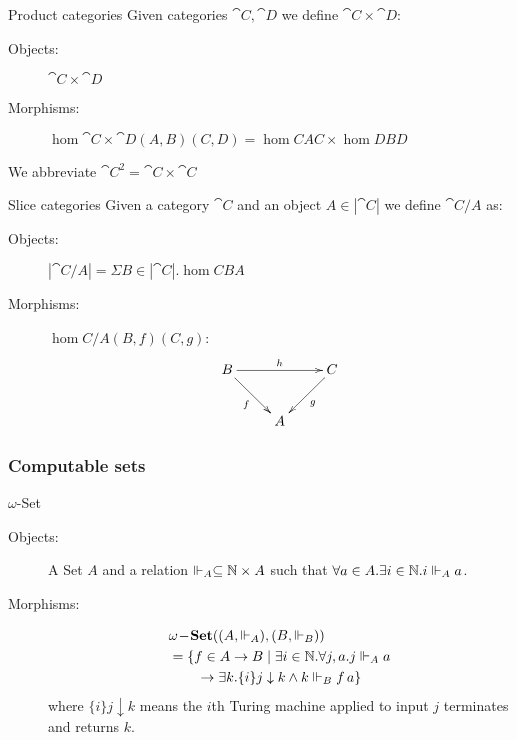 \documentclass[handout]{beamer}
\begin{document}
\begin{frame}
  \begin{block}{Product categories}
    Given categories $\cat{C},\cat{D}$ we define $\cat{C}\times\cat{D}$:
    \begin{description}
   \item[Objects:] $\cat{C}\times \cat{D}$
     
    \item[Morphisms:] $\hom{\cat{C}\times\cat{D}}{(A,B)}{(C,D)}
      = \hom{C}{A}{C} \times \hom{D}{B}{D}$
     \end{description}
     We abbreviate $\cat{C}^2 = \cat{C}\times\cat{C}$
  \end{block}


    \pause
  \begin{block}{Slice categories}
    Given a category $\cat{C}$ and an object $A\in|\cat{C}|$ we define
    $\cat{C}/A$ as:
   \begin{description}
   \item[Objects:] $|\cat{C/A}|= \Sigma B\in|\cat{C}|.\hom{C}{B}{A}$
     
    \item[Morphisms:] $\hom{C/A}{(B,f)}{(C,g)}$:
      \[\xymatrix{B \ar[dr]_f \ar[rr]^h && \ar[dl]^g C \\
        & A & }\]
     \end{description}
  \end{block}

\end{frame}


\begin{frame}
  \frametitle{Computable sets}
  
    \begin{block}{$\omega$-Set}
   \begin{description}
   \item[Objects:] A Set $A$ and a relation $\Vdash_A \subseteq \mathbb{N}
      \times A$ such that $\forall a\in A.\exists i\in\mathbb{N}.i \Vdash_A a$.
    \item[Morphisms:] 
      \begin{align*}
        &\mathbf{\omega\!-\!Set}((A,\Vdash_A),(B,\Vdash_B))\\
        &= \{ f \in A\to B \mid \exists i\in \mathbb{N}.
      \forall j,a.j \Vdash_A a \\
       &\qquad \to\exists k.\{i\}j
      \downarrow k \wedge k \Vdash_B f\,a \}
      \end{align*}
       where $\{i\}j\downarrow k$ means the $i$th Turing machine applied
       to input $j$ terminates and returns $k$.
     \end{description}
  \end{block}
\end{frame}
\end{document}
